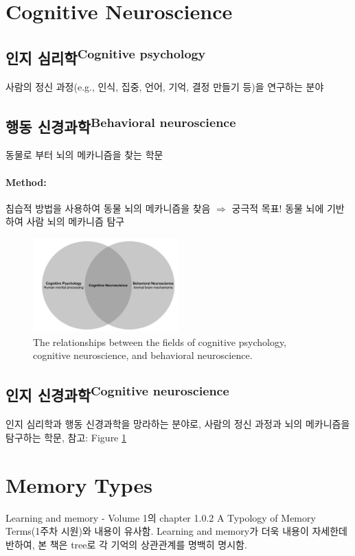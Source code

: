 \documentclass[../note.tex]{subfiles}
\begin{document}
\section{Cognitive Neuroscience}

\subsection{인지 심리학\textsuperscript{Cognitive psychology}}
사람의 정신 과정(e.g., 인식, 집중, 언어, 기억, 결정 만들기 등)을 연구하는 분야

\subsection{행동 신경과학\textsuperscript{Behavioral neuroscience}}
동물로 부터 뇌의 메카니즘을 찾는 학문\\

\paragraph{Method: }
침습적 방법을 사용하여 동물 뇌의 메카니즘을 찾음 $\Rightarrow$ 궁극적 목표! 동물 뇌에 기반하여 사람 뇌의 메카니즘 탐구

\begin{figure}[h]
  \centering
  \includegraphics[width=0.5\textwidth]{image/cognitive_relationship}
  \caption{The relationships between the fields of cognitive psychology, cognitive
neuroscience, and behavioral neuroscience.}
  \label{fig:cognitive_relationship}
\end{figure}

\subsection{인지 신경과학\textsuperscript{Cognitive neuroscience}}
인지 심리학과 행동 신경과학을 망라하는 분야로, 사람의 정신 과정과 뇌의 메카니즘을 탐구하는 학문, 참고: Figure \ref{fig:cognitive_relationship}


\section{Memory Types}
Learning and memory - Volume 1의 chapter 1.0.2 A Typology of Memory Terms(1주차 시원)와 내용이 유사함.
Learning and memory가 더욱 내용이 자세한데 반하여, 본 책은 tree로 각 기억의 상관관계를 명백히 명시함.
\end{document}
